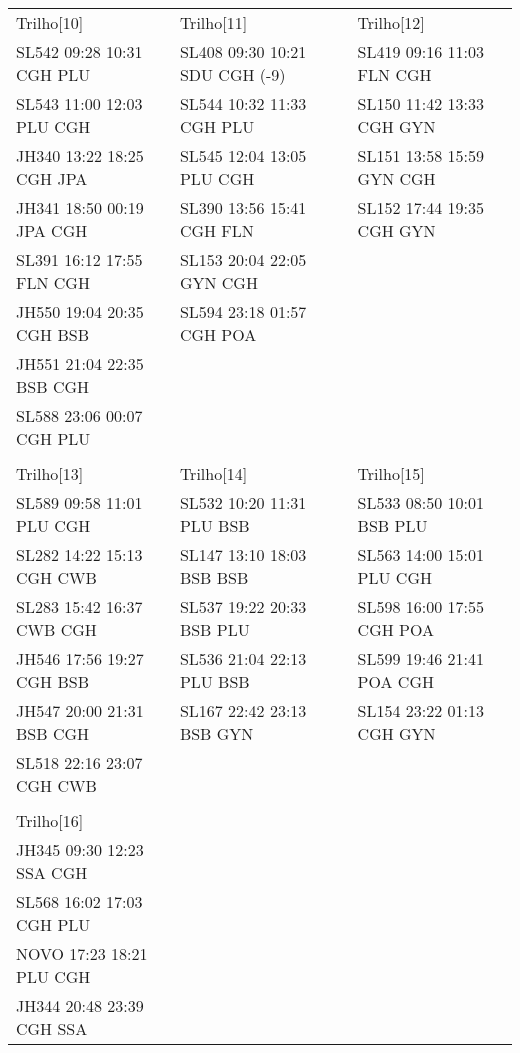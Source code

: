\documentclass{endm}
\begin{document}
\begin{center}
\begin{longtable}{lll}
\\

\scriptsize Trilho[10] &       \scriptsize Trilho[11] &       \scriptsize Trilho[12] \\
\scriptsize SL542 09:28 10:31 CGH PLU &       \scriptsize SL408 09:30 10:21 SDU CGH (-9) &       \scriptsize SL419 09:16 11:03 FLN CGH\\
\scriptsize SL543 11:00 12:03 PLU CGH &       \scriptsize SL544 10:32 11:33 CGH PLU &       \scriptsize SL150 11:42 13:33 CGH GYN\\
\scriptsize JH340 13:22 18:25 CGH JPA &       \scriptsize SL545 12:04 13:05 PLU CGH &       \scriptsize SL151 13:58 15:59 GYN CGH\\
\scriptsize JH341 18:50 00:19 JPA CGH &       \scriptsize SL390 13:56 15:41 CGH FLN &       \scriptsize SL152 17:44 19:35 CGH GYN\\
\scriptsize SL391 16:12 17:55 FLN CGH &       \scriptsize SL153 20:04 22:05 GYN CGH & \\
\scriptsize JH550 19:04 20:35 CGH BSB &       \scriptsize SL594 23:18 01:57 CGH POA & \\
\scriptsize JH551 21:04 22:35 BSB CGH	& & \\
\scriptsize SL588 23:06 00:07 CGH PLU	& & \\

\\

\scriptsize Trilho[13] &       \scriptsize Trilho[14] &       \scriptsize Trilho[15] \\
\scriptsize SL589 09:58 11:01 PLU CGH &       \scriptsize SL532 10:20 11:31 PLU BSB &       \scriptsize SL533 08:50 10:01 BSB PLU \\
\scriptsize SL282 14:22 15:13 CGH CWB &       \scriptsize 	SL147 13:10 18:03 BSB BSB &       \scriptsize SL563 14:00 15:01 PLU CGH \\
\scriptsize SL283 15:42 16:37 CWB CGH &       \scriptsize 	SL537 19:22 20:33 BSB PLU &       \scriptsize SL598 16:00 17:55 CGH POA \\
\scriptsize JH546 17:56 19:27 CGH BSB &       \scriptsize SL536 21:04 22:13 PLU BSB &       \scriptsize SL599 19:46 21:41 POA CGH \\
\scriptsize JH547 20:00 21:31 BSB CGH &       \scriptsize SL167 22:42 23:13 BSB GYN &       \scriptsize SL154 23:22 01:13 CGH GYN \\
\scriptsize SL518 22:16 23:07 CGH CWB	 & & \\	

\\
		
\scriptsize Trilho[16]	& & \\	
\scriptsize JH345 09:30 12:23 SSA CGH	& & \\
\scriptsize SL568 16:02 17:03 CGH PLU	& & \\
\scriptsize NOVO  17:23 18:21 PLU CGH	& & \\
\scriptsize JH344 20:48 23:39 CGH SSA	& & \\	


		
\end{longtable}

\end{center}
\end{document}
